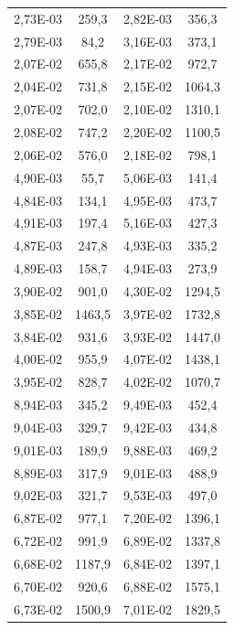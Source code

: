 \begin{figure}[h]
\begin{minipage}[l]{0.48\textwidth}
\begin{tabular}{|c|c|c|c|}
            2,73E-03 & 259,3 & 2,82E-03 & 356,3\\
            2,79E-03 & 84,2 & 3,16E-03 & 373,1\\
            2,07E-02 & 655,8 & 2,17E-02 & 972,7\\
            2,04E-02 & 731,8 & 2,15E-02 & 1064,3\\
            2,07E-02 & 702,0 & 2,10E-02 & 1310,1\\
            2,08E-02 & 747,2 & 2,20E-02 & 1100,5\\
            2,06E-02 & 576,0 & 2,18E-02 & 798,1\\
            4,90E-03 & 55,7 & 5,06E-03 & 141,4\\
            4,84E-03 & 134,1 & 4,95E-03 & 473,7\\
            4,91E-03 & 197,4 & 5,16E-03 & 427,3\\
            4,87E-03 & 247,8 & 4,93E-03 & 335,2\\
            4,89E-03 & 158,7 & 4,94E-03 & 273,9\\
            3,90E-02 & 901,0 & 4,30E-02 & 1294,5\\
            3,85E-02 & 1463,5 & 3,97E-02 & 1732,8\\
            3,84E-02 & 931,6 & 3,93E-02 & 1447,0\\
            4,00E-02 & 955,9 & 4,07E-02 & 1438,1\\
            3,95E-02 & 828,7 & 4,02E-02 & 1070,7\\
            8,94E-03 & 345,2 & 9,49E-03 & 452,4\\
            9,04E-03 & 329,7 & 9,42E-03 & 434,8\\
            9,01E-03 & 189,9 & 9,88E-03 & 469,2\\
            8,89E-03 & 317,9 & 9,01E-03 & 488,9\\
            9,02E-03 & 321,7 & 9,53E-03 & 497,0\\
            6,87E-02 & 977,1 & 7,20E-02 & 1396,1\\
            6,72E-02 & 991,9 & 6,89E-02 & 1337,8\\
            6,68E-02 & 1187,9 & 6,84E-02 & 1397,1\\
            6,70E-02 & 920,6 & 6,88E-02 & 1575,1\\
            6,73E-02 & 1500,9 & 7,01E-02 & 1829,5\\
	        \hline
	    \end{tabular}
	\end{minipage}
	\begin{minipage}[r]{0.48\textwidth}

\end{minipage}
\end{figure}
